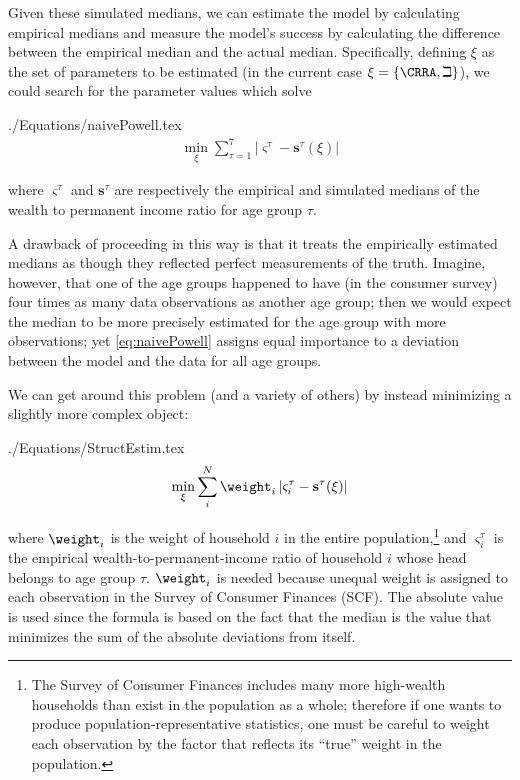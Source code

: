 \documentclass[titlepage]{\econtex}
\begin{document}
  Given these simulated medians, we can estimate the model by
  calculating empirical medians and measure the model's success
  by calculating the difference between the empirical median and the
  actual median.  Specifically, defining $\xi$ as the set of parameters
  to be estimated (in the current case $\xi =\{\CRRA ,{\beth}\}$), we could search for
  the parameter values which solve
  \begin{verbatimwrite}{./Equations/naivePowell.tex}
    \begin{eqnarray}
      \min_{\xi} \sum_{\tau=1}^{7} |\varsigma^{\tau} -\mathbf{s}^{\tau}(\xi)|  \label{eq:naivePowell}
    \end{eqnarray}
  \end{verbatimwrite}
  
  where $\varsigma^{\tau }$ and $\mathbf{s}^{\tau}$ are respectively the empirical and simulated medians of the wealth to permanent income ratio for age group $\tau $.

  A drawback of proceeding in this way is that it treats the empirically
  estimated medians as though they reflected perfect measurements of the
  truth. Imagine, however, that one of the age groups happened to have
  (in the consumer survey) four times as many data observations as
  another age group; then we would expect the median to be more
  precisely estimated for the age group with more observations; yet
  \eqref{eq:naivePowell} assigns equal importance to a deviation between
  the model and the data for all age groups.

  We can get around this problem (and a variety of others) by instead minimizing a slightly more complex object:
  \begin{verbatimwrite}{./Equations/StructEstim.tex}
    \begin{equation}
      \min_{\xi}\sum\limits_{i}^{N}\weight _{i}\left|\varsigma_{i}^{\tau }-\mathbf{s}^{\tau}(\xi )\right|\label{eq:StructEstim}
    \end{equation}
  \end{verbatimwrite}
  
  where $\weight_{i}$ is the weight of household $i$ in the entire
  population,\footnote{The Survey of Consumer Finances includes many
    more high-wealth households than exist in the population as a whole;
    therefore if one wants to produce population-representative
    statistics, one must be careful to weight each observation by the
    factor that reflects its ``true'' weight in the population.} and
  $\varsigma_{i}^{\tau }$ is the empirical wealth-to-permanent-income
  ratio of household $i$ whose head belongs to age group
  $\tau$. $\weight _{i}$ is needed because unequal weight is assigned to
  each observation in the Survey of Consumer Finances (SCF). The
  absolute value is used since the formula is based on the fact that the
  median is the value that minimizes the sum of the absolute deviations
  from itself.
\end{document}
